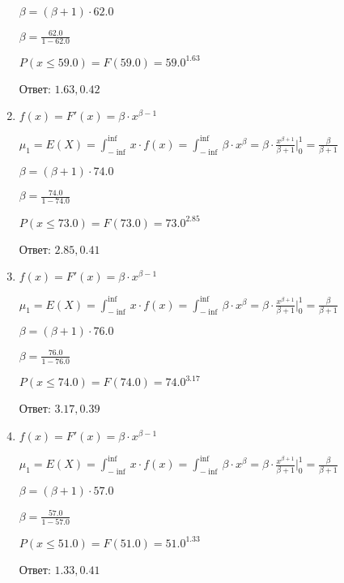 \documentclass[a4paper,12pt]{article}
\begin{document}
\begin{enumerate}
	$\beta = (\beta + 1) \cdot 62.0$

	$\beta = \frac{62.0}{1 - 62.0}$

	$ P(x \le 59.0) = F(59.0) = 59.0^{1.63} $

    Ответ: $1.63, 0.42$
	


\item

	

	$f(x) = F'(x) = \beta \cdot x^{\beta - 1}$

	$\mu_{1} = E(X) = \int_{-\inf}^{\inf}x \cdot f(x) = \int_{-\inf}^{\inf} \beta \cdot x^{\beta} = \beta \cdot \frac{x^{\beta + 1}}{\beta + 1}\bigg|_0^1 = \frac{\beta}{\beta + 1}$

	$\beta = (\beta + 1) \cdot 74.0$

	$\beta = \frac{74.0}{1 - 74.0}$

	$ P(x \le 73.0) = F(73.0) = 73.0^{2.85} $

    Ответ: $2.85, 0.41$
	


\item

	

	$f(x) = F'(x) = \beta \cdot x^{\beta - 1}$

	$\mu_{1} = E(X) = \int_{-\inf}^{\inf}x \cdot f(x) = \int_{-\inf}^{\inf} \beta \cdot x^{\beta} = \beta \cdot \frac{x^{\beta + 1}}{\beta + 1}\bigg|_0^1 = \frac{\beta}{\beta + 1}$

	$\beta = (\beta + 1) \cdot 76.0$

	$\beta = \frac{76.0}{1 - 76.0}$

	$ P(x \le 74.0) = F(74.0) = 74.0^{3.17} $

    Ответ: $3.17, 0.39$
	


\item

	

	$f(x) = F'(x) = \beta \cdot x^{\beta - 1}$

	$\mu_{1} = E(X) = \int_{-\inf}^{\inf}x \cdot f(x) = \int_{-\inf}^{\inf} \beta \cdot x^{\beta} = \beta \cdot \frac{x^{\beta + 1}}{\beta + 1}\bigg|_0^1 = \frac{\beta}{\beta + 1}$

	$\beta = (\beta + 1) \cdot 57.0$

	$\beta = \frac{57.0}{1 - 57.0}$

	$ P(x \le 51.0) = F(51.0) = 51.0^{1.33} $

    Ответ: $1.33, 0.41$
	


\end{enumerate}
\end{document}
